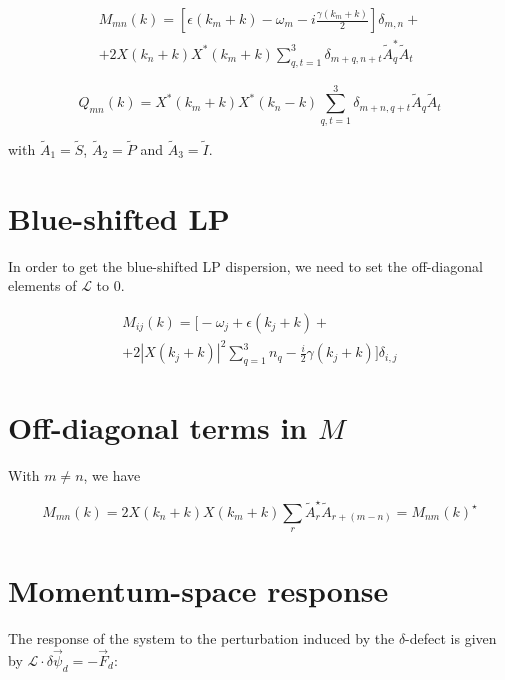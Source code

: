 \documentclass[a4paper,prb,10pt,aps,twocolumn]{revtex4-1}
\begin{document}
\begin{multline}
  \label{eq:3}
M_{mn}(k)=\left[\epsilon\left(k_{m}+k\right)-\omega_{m}-i\frac{\gamma\left(k_{m}+k\right)}{2}\right]\delta_{m,n}+\\
+2X(k_{n}+k)X^{*}(k_{m}+k)\sum_{q,t=1}^{3}\delta_{m+q,n+t}\tilde{A}_{q}^{*}\tilde{A}_{t}
\end{multline}

\begin{equation}
  \label{eq:4}
Q_{mn}(k)=X^{*}(k_{m}+k)X^{*}(k_{n}-k)\sum_{q,t=1}^{3}\delta_{m+n,q+t}\tilde{A}_{q}\tilde{A}_{t}  
\end{equation}

with $\tilde{A}_{1}=\tilde{S}$, $\tilde{A}_{2}=\tilde{P}$
and $\tilde{A}_{3}=\tilde{I}$.

\section{Blue-shifted LP}
In order to get the blue-shifted LP dispersion, we need to set the
off-diagonal elements of $\mathcal{L}$ to 0.

\begin{multline}
  \label{eq:5}
M_{ij}(k)=\Bigg[-\omega_{j}+\epsilon\left(k_{j}+k\right)+\\
+2\left|X(k_{j}+k)\right|^{2}\sum_{q=1}^{3}n_{q}-\frac{i}{2}\gamma\left(k_{j}+k\right)\Bigg]\delta_{i,j}
\end{multline}

\section{Off-diagonal terms in $M$}
With $m\neq n$, we have

\begin{equation}
  \label{eq:6}
M_{mn}(k)=2X(k_{n}+k)X(k_{m}+k)\sum_{r}\tilde{A}_{r}^{\star}\tilde{A}_{r+\left(m-n\right)}=M_{nm}(k)^{\star}
\end{equation}

\section{Momentum-space response}
The response of the system to the perturbation induced by the
$\delta$-defect is given by
$\mathcal{L} \cdot \delta\vec{\psi}_{d}=-\vec{F}_{d}$:
\end{document}
